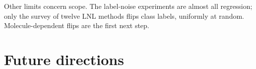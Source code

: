 Other limits concern scope. The label-noise experiments are almost all regression; only the survey of twelve LNL methods flips class labels, uniformly at random. Molecule-dependent flips are the first next step. %



\section{Future directions}

